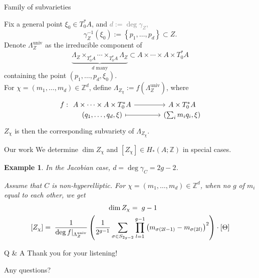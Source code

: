 \documentclass[pdf]{beamer}
\numberwithin{equation}{section}
\theoremstyle{plain}
\newtheorem{eg}[theorem]{Example}
\theoremstyle{plain}
\theoremstyle{remark}
\newcommand*{\ignore}[1]{\textcolor{gray}{#1}}
\DeclareMathOperator{\univ}{\operatorname{univ}}
\begin{document}
\begin{frame}[fragile]{Family of subvarieties}
\begin{definition}
Fix a general point $\xi_0 \in T_0^*A$, and \ignore{$d:=\deg \gamma_Z$,}
$$\gamma_Z^{-1}(\xi_0):= \left\{ p_1,\ldots,p_d \right\} \subset Z.$$
Denote $\Lambda_Z^{\univ}$ as the irreducible component of 
$$\underbrace{\Lambda_Z \times_{T_0^* A} \cdots \times_{T_0^* A} \Lambda_Z}_{\text{$d$ many}} \subset A \times \cdots \times A \times T_0^* A$$
containing the point $(p_1,\ldots,p_d, \xi_0)$.
\\[3mm]

For $\chi=(m_1,\ldots,m_d) \in \mathbb{Z}^d$, define $\Lambda_{Z_{\chi}}:= f(\Lambda_Z^{\univ})$, where 
\[\begin{tikzcd}[ampersand replacement=\&,column sep={between origins, 40mm},row sep={-1mm}]
	{f:} \&[-21mm] {A \times \cdots \times A \times T_0^* A} \& {A \times T_0^* A} \\
	\& {(q_1,\ldots,q_d,\xi)} \& {\left( \sum_i m_iq_i, \xi \right)}
	\arrow[from=1-2, to=1-3]
	\arrow[maps to, from=2-2, to=2-3]
\end{tikzcd}\]
$Z_{\chi}$ is then the corresponding subvariety of $\Lambda_{Z_{\chi}}$.
\end{definition}
\end{frame}
\endgroup

\begin{frame}[fragile]{Our work}
We determine $\dim Z_{\chi}$ and $[Z_{\chi}] \in H_*(A;\mathbb{Z})$ in special cases.
\begin{eg}
In the Jacobian case, $d=\deg \gamma_C = 2g-2$.

Assume that $C$ is non-hyperelliptic. For $\chi=(m_1,\ldots,m_d) \in \mathbb{Z}^d$, when no $g$ of $m_i$ equal to each other, we get 
\begin{equation*}
\begin{aligned}
  &\hspace{10mm}\dim Z_{\chi} =\; g-1 \\ 
  [Z_{\chi}]=\;\frac{1}{\deg f|_{\Lambda_Z^{\univ}}}&\left( \frac{1}{2^{g-1}} \sum_{\sigma \in S_{2g-2}} \prod_{l=1}^{g-1} \left( m_{\sigma(2l-1)}-m_{\sigma(2l)} \right)^2  \right) \cdot [\Theta]
\end{aligned}
\end{equation*}
\end{eg}
\end{frame}

\begin{frame}[fragile]{Q \& A}
Thank you for your listening! 

Any questions?


\end{frame}
\end{document}

